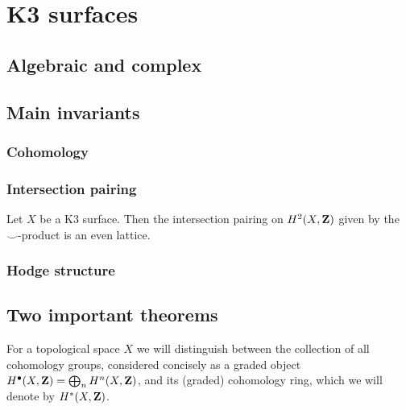 \section{K3 surfaces}

\subsection{Algebraic and complex}

\subsection{Main invariants}

\subsubsection{Cohomology}
\subsubsection{Intersection pairing}

\begin{proposition}
    \label{intersection pairing on K3 is even}
    Let $X$ be a K3 surface. Then the intersection pairing on $H^2(X, \mathbf Z)$ given by the $\smallsmile$-product is an even lattice. 
\end{proposition}

\subsubsection{Hodge structure}

\subsection{Two important theorems}

\begin{remark}
    For a topological space $X$ we will distinguish between the collection of all cohomology groups, considered concisely as a graded object $H^{\bullet}(X, \mathbf Z) = \bigoplus_n H^{n}(X, \mathbf Z)$, and its (graded) cohomology ring, which we will denote by $H^{*}(X, \mathbf Z)$.
\end{remark}
